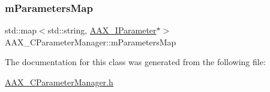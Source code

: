 \subsubsection{\texorpdfstring{mParametersMap}{mParametersMap}}
{\footnotesize\ttfamily std\+::map$<$std\+::string, \mbox{\hyperlink{a01857}{A\+A\+X\+\_\+\+I\+Parameter}}$\ast$$>$ A\+A\+X\+\_\+\+C\+Parameter\+Manager\+::m\+Parameters\+Map\hspace{0.3cm}{\ttfamily [protected]}}



The documentation for this class was generated from the following file\+:\begin{DoxyCompactItemize}
\item 
\mbox{\hyperlink{a00458}{A\+A\+X\+\_\+\+C\+Parameter\+Manager.\+h}}\end{DoxyCompactItemize}
